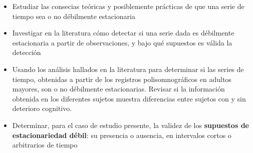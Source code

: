 \begin{itemize}
\item Estudiar las consecias te\'oricas y posiblemente pr\'acticas de que una serie de tiempo
sea o no d\'ebilmente estacionaria

\item Investigar en la literatura c\'omo detectar si una serie dada es d\'ebilmente estacionaria
a partir de observaciones, y bajo qu\'e supuestos es v\'alida la detecci\'on

\item Usando los an\'alisis hallados en la literatura para determinar si las series de tiempo,
obtenidas a partir de los registros polisomnogr\'aficos en adultos mayores, son o no
d\'ebilmente estacionarias.
Revisar si la informaci\'on obtenida en los diferentes sujetos muestra diferencias entre
sujetos con y sin deterioro cognitivo.

\item Determinar, para el caso de estudio presente, la validez de los \textbf{supuestos de 
estacionariedad d\'ebil}: su presencia o ausencia, en intervalos cortos o arbitrarios de tiempo
\end{itemize}

